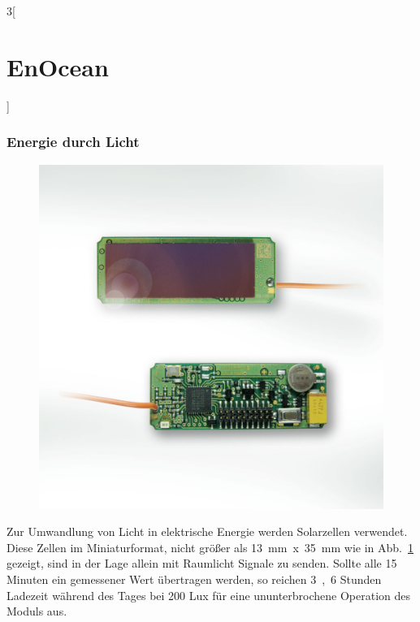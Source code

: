 \begin{multicols}{3}[\section{EnOcean}]
\subsubsection*{Energie durch Licht}
\begin{figure}
  \vspace{-20pt}
  \begin{center}
  	\hspace{-10pt}
    \includegraphics[width=1\linewidth]{Kapitel/EnOcean/Grafiken/EnOcean_STM310_mit_Solarzelle_white.jpg}
    \label{fig:enocean.stm310}
  \end{center}
  \vspace{-15pt}
\end{figure}
Zur Umwandlung von Licht in elektrische Energie werden Solarzellen verwendet. Diese Zellen im Miniaturformat, nicht größer als \SI{13}{mm}~x~\SI{35}{mm} wie in Abb.~\ref{fig:enocean.stm310} gezeigt, sind in der Lage allein mit Raumlicht Signale zu senden. Sollte alle \si{15} Minuten ein gemessener Wert übertragen werden, so reichen \si{3,6} Stunden Ladezeit während des Tages bei \si{200} Lux für eine ununterbrochene Operation des Moduls aus.~\cite{enocean.1}


\end{multicols}
